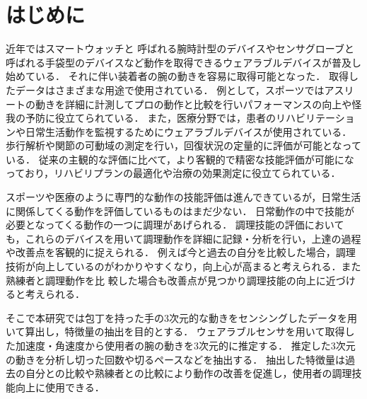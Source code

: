 \chapter{はじめに}
近年ではスマートウォッチと
呼ばれる腕時計型のデバイスやセンサグローブと呼ばれる手袋型のデバイスなど動作を取得できるウェアラブルデバイスが普及し始めている．
それに伴い装着者の腕の動きを容易に取得可能となった．
取得したデータはさまざまな用途で使用されている．
例として，スポーツではアスリートの動きを詳細に計測してプロの動作と比較を行いパフォーマンスの向上や怪我の予防に役立てられている．
また，医療分野では，患者のリハビリテーションや日常生活動作を監視するためにウェアラブルデバイスが使用されている．
歩行解析や関節の可動域の測定を行い，回復状況の定量的に評価が可能となっている．
従来の主観的な評価に比べて，より客観的で精密な技能評価が可能になっており，リハビリプランの最適化や治療の効果測定に役立てられている．

スポーツや医療のように専門的な動作の技能評価は進んできているが，日常生活に関係してくる動作を評価しているものはまだ少ない．
日常動作の中で技能が必要となってくる動作の一つに調理があげられる．
調理技能の評価においても，これらのデバイスを用いて調理動作を詳細に記録・分析を行い，上達の過程や改善点を客観的に捉えられる．
例えば今と過去の自分を比較した場合，調理技術が向上しているのがわかりやすくなり，向上心が高まると考えられる．また熟練者と調理動作を比
較した場合も改善点が見つかり調理技能の向上に近づけると考えられる．

そこで本研究では包丁を持った手の3次元的な動きをセンシングしたデータを用いて算出し，特徴量の抽出を目的とする．
ウェアラブルセンサを用いて取得した加速度・角速度から使用者の腕の動きを3次元的に推定する．
推定した3次元の動きを分析し切った回数や切るペースなどを抽出する．
抽出した特徴量は過去の自分との比較や熟練者との比較により動作の改善を促進し，使用者の調理技能向上に使用できる．
